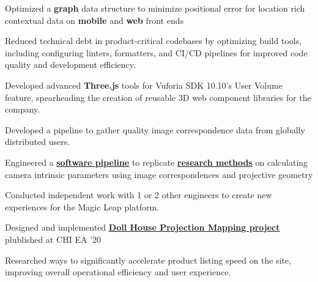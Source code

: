 \documentclass[]{plushcv}
\begin{document}
\begin{minipage}[t]{0.70\textwidth}
    \begin{tightemize}
        \item Optimized a \textbf{graph} data structure to minimize positional error for location rich contextual data on \textbf{mobile} and \textbf{web} front ends
        \item Reduced technical debt in product-critical codebases by optimizing build tools, including configuring linters, formatters, and CI/CD pipelines for improved code quality and development efficiency.                 
        \item Developed advanced \textbf{Three.js} tools for Vuforia SDK 10.10's User Volume feature, spearheading the creation of reusable 3D web component libraries for the company.
    \end{tightemize}
    \sectionsep

    \begin{tightemize}
        \sectionsep
        \item Developed a pipeline to gather quality
        image correspondence data from globally distributed users.
        \item Engineered a
        \textbf{\href{https://github.com/johanos/pollefeys-self-calibration-and-metric-reconstruction}{software pipeline}}
        to replicate 
        \textbf{\href{https://people.inf.ethz.ch/pomarc/pubs/PollefeysIJCV99.pdf}{research methods}}
        on calculating camera intrinsic parameters using image correspondences and projective geometry
    \end{tightemize}
    \sectionsep

    \begin{tightemize}
        \sectionsep
        \item Conducted independent work with 1 or 2 other engineers to create new experiences for the Magic Leap platform.
        \item Designed and implemented \textbf{\href{https://dl.acm.org/doi/10.1145/3334480.3383180}{Doll House Projection Mapping project}} 
            \subitem plublished at CHI EA ’20
        \item Researched ways to significantly accelerate product listing speed on the site, improving overall operational efficiency and user experience. 
    \end{tightemize}
    \sectionsep


\end{minipage}
\end{document}
